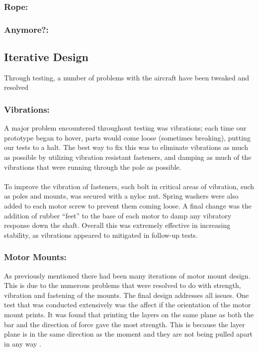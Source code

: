 \subsubsection*{Rope:}  

\subsubsection*{Anymore?:}

\subsection{Iterative Design}
Through testing, a number of problems with the aircraft have been tweaked and resolved

\subsubsection*{Vibrations:} A major problem encountered throughout testing was vibrations; each time our prototype began to hover, parts would come loose (sometimes breaking), putting our tests to a halt. The best way to fix this was to eliminate vibrations as much as possible by utilizing vibration resistant fasteners, and damping as much of the vibrations that were running through the pole as possible.\\\\
To improve the vibration of fasteners, each bolt in critical areas of vibration, such as poles and mounts, was secured with a nyloc nut. Spring washers were also added to each motor screw to prevent them coming loose. A final change was the addition of rubber ``feet'' to the base of each motor to damp any vibratory response down the shaft. Overall this was extremely effective in increasing stability, as vibrations appeared to mitigated in follow-up tests.


\subsubsection*{Motor Mounts:} As previously mentioned there had been many iterations of motor mount design. This is due to the numerous problems that were resolved to do with strength, vibration and fastening of the mounts. The final design addresses all issues. One test that was conducted extensively was the affect if the orientation of the motor mount prints. It was found that printing the layers on the same plane as both the bar and the direction of force gave the most strength. This is because the layer plane is in the same direction as the moment and they are not being pulled apart in any way . 

